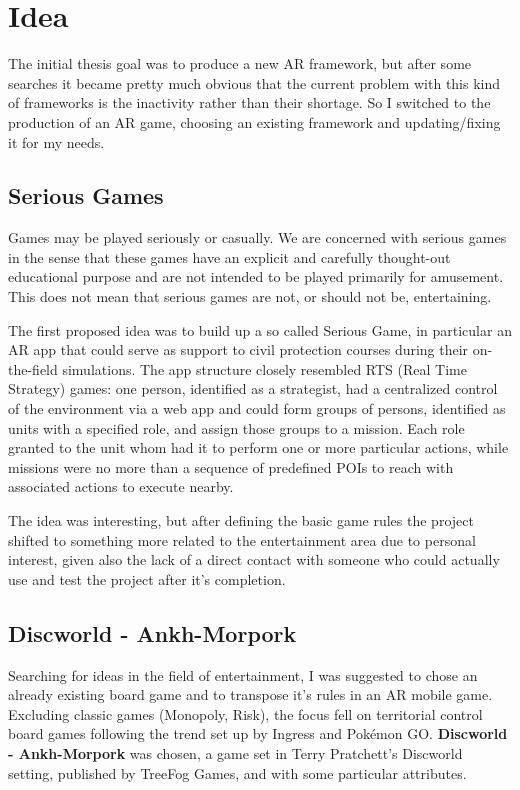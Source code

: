 \chapter{Idea}

	The initial thesis goal was to produce a new AR framework, but after some searches it became pretty much obvious that the current problem with this kind of frameworks is the inactivity rather than their shortage.
	So I switched to the production of an AR game, choosing an existing framework and updating/fixing it for my needs.
	
	\section{Serious Games}
	
		\begin{quoting}
			Games may be played seriously or casually. We are concerned with serious games in the sense that these games have an explicit and carefully thought-out educational purpose and are not intended to be played primarily for amusement. This does not mean that serious games are not, or should not be, entertaining.~\cite{abt:serious}
		\end{quoting}
	
		The first proposed idea was to build up a so called Serious Game, in particular an AR app that could serve as support to civil protection courses during their on-the-field simulations.
		The app structure closely resembled RTS (Real Time Strategy) games: one person, identified as a strategist, had a centralized control of the environment via a web app and could form groups of persons, identified as units with a specified role, and assign those groups to a mission.
		Each role granted to the unit whom had it to perform one or more particular actions, while missions were no more than a sequence of predefined POIs to reach with associated actions to execute nearby.
		
		The idea was interesting, but after defining the basic game rules the project shifted to something more related to the entertainment area due to personal interest, given also the lack of a direct contact with someone who could actually use and test the project after it's completion.
	
	\section{Discworld - Ankh-Morpork}
	
		Searching for ideas in the field of entertainment, I was suggested to chose an already existing board game and to transpose it's rules in an AR mobile game.
		Excluding classic games (Monopoly, Risk), the focus fell on territorial control board games following the trend set up by Ingress and Pokémon GO.
		\textbf{Discworld - Ankh-Morpork} was chosen, a game set in Terry Pratchett's Discworld setting, published by TreeFog Games, and with some particular attributes.
		
